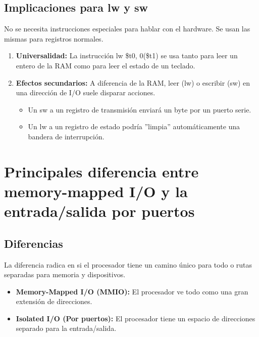 \documentclass[]{article}
\begin{document}
	\subsection{Implicaciones para lw y sw}
		No se necesita instrucciones especiales para hablar con el hardware. Se usan las mismas para registros normales.
		\begin{enumerate}
			\item \textbf{Universalidad:} La instrucción lw \$t0, 0(\$t1) se usa tanto para leer un entero de la RAM como para leer el estado de un teclado.
			\item \textbf{Efectos secundarios:} A diferencia de la RAM, leer (lw) o escribir (sw) en una dirección de I/O suele disparar acciones.
			\begin{itemize}
				\item Un sw a un registro de transmisión enviará un byte por un puerto serie.
				\item Un lw a un registro de estado podría ''limpia'' automáticamente una bandera de interrupción.
			\end{itemize}
		\end{enumerate}
		
\section{Principales diferencia entre memory-mapped I/O y la entrada/salida por 
	puertos}
	
	\subsection{Diferencias}
		La diferencia radica en si el procesador tiene un camino único para todo o rutas separadas para memoria y dispositivos.
		\begin{itemize}
			\item\textbf{ Memory-Mapped I/O (MMIO):} El procesador ve todo como una gran extensión de direcciones.
			\item \textbf{Isolated I/O (Por puertos):} El procesador tiene un espacio de direcciones separado para la entrada/salida.
		\end{itemize}
		
\end{document}
